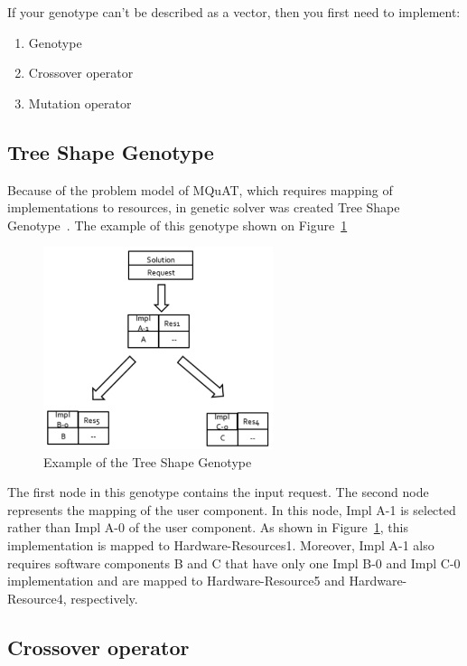 If your genotype can't be described as a vector, then you first need to implement:

\begin{enumerate}
	\item Genotype
	\item Crossover operator
	\item Mutation operator
\end{enumerate}

\subsection{Tree Shape Genotype}

Because of the problem model of MQuAT, which requires mapping of implementations to resources, in genetic solver was created Tree Shape Genotype~\cite{ahmad18}.
The example of this genotype shown on Figure~\ref{fig:TreeShapeGenotypeExample}

\begin{figure}
	\centering
	\includegraphics[width=0.6\textwidth]{images/TreeShapeGenotypeExample.png}
	\caption[Example of the Tree Shape Genotype]{Example of the Tree Shape Genotype}
	\label{fig:TreeShapeGenotypeExample}
\end{figure}

The first node in this genotype contains the input request. The second node represents the mapping of the user component. In this node, Impl A-1 is selected rather than Impl A-0 of the user component. As shown in Figure~\ref{fig:TreeShapeGenotypeExample}, this implementation is mapped to Hardware-Resources1. Moreover, Impl A-1 also requires software components B and C that have only one Impl B-0 and Impl C-0 implementation and are mapped to Hardware-Resource5 and Hardware-Resource4, respectively.

\subsection{Crossover operator}
\label{sec:GeneticSolverCrossover}

